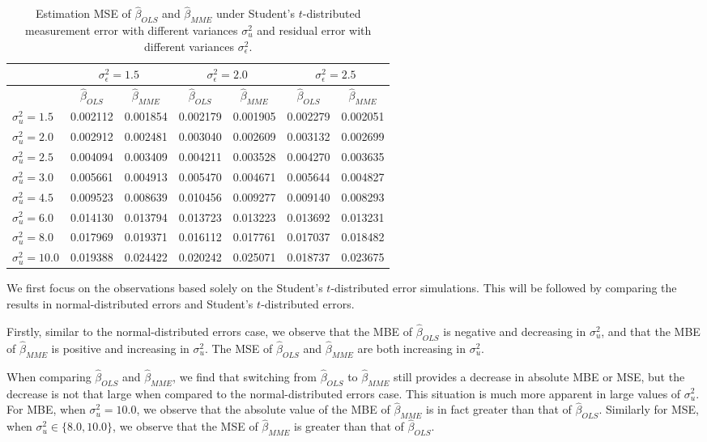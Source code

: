 \documentclass{article}
\begin{document}
\begin{table}[ht]
    \centering
    \caption{Estimation MSE of $\hat{\beta}_{OLS}$ and $\hat{\beta}_{MME}$ under Student's $t$-distributed measurement error with different variances $\sigma^2_u$ and residual error with different variances $\sigma^2_\epsilon$.}
    \label{Tab:MSE_t}
    \begin{tabular}[t]{lcccccc}
        \hline
        &\multicolumn{2}{c}{$\sigma^2_\epsilon=1.5$}&\multicolumn{2}{c}{$\sigma^2_\epsilon=2.0$}&\multicolumn{2}{c}{$\sigma^2_\epsilon=2.5$}\\
        \hline
        &$\hat{\beta}_{OLS}$&$\hat{\beta}_{MME}$&$\hat{\beta}_{OLS}$&$\hat{\beta}_{MME}$&$\hat{\beta}_{OLS}$&$\hat{\beta}_{MME}$\\
        \hline
        $\sigma^2_u = 1.5$&0.002112&0.001854&0.002179&0.001905&0.002279&0.002051\\
        $\sigma^2_u = 2.0$&0.002912&0.002481&0.003040&0.002609&0.003132&0.002699\\
        $\sigma^2_u = 2.5$&0.004094&0.003409&0.004211&0.003528&0.004270&0.003635\\
        $\sigma^2_u = 3.0$&0.005661&0.004913&0.005470&0.004671&0.005644&0.004827\\
        $\sigma^2_u = 4.5$&0.009523&0.008639&0.010456&0.009277&0.009140&0.008293\\
        $\sigma^2_u = 6.0$&0.014130&0.013794&0.013723&0.013223&0.013692&0.013231\\
        $\sigma^2_u = 8.0$&0.017969&0.019371&0.016112&0.017761&0.017037&0.018482\\
        $\sigma^2_u = 10.0$&0.019388&0.024422&0.020242&0.025071&0.018737&0.023675\\
        \hline
    \end{tabular}
\end{table}

We first focus on the observations based solely on the Student's $t$-distributed error simulations. This will be followed by comparing the results in normal-distributed errors and Student's $t$-distributed errors. 

Firstly, similar to the normal-distributed errors case, we observe that the MBE of $\hat{\beta}_{OLS}$ is negative and decreasing in $\sigma^2_u$,
and that the MBE of $\hat{\beta}_{MME}$ is positive and increasing in $\sigma^2_u$.
The MSE of $\hat{\beta}_{OLS}$ and $\hat{\beta}_{MME}$ are both increasing in $\sigma^2_u$.

When comparing $\hat{\beta}_{OLS}$ and $\hat{\beta}_{MME}$,
we find that switching from $\hat{\beta}_{OLS}$ to $\hat{\beta}_{MME}$ still provides a decrease in absolute MBE or MSE,
but the decrease is not that large when compared to the normal-distributed errors case.
This situation is much more apparent in large values of $\sigma^2_u$.
For MBE, when $\sigma^2_u = 10.0$, we observe that the absolute value of the MBE of $\hat{\beta}_{MME}$ is in fact greater than that of $\hat{\beta}_{OLS}$.
Similarly for MSE, when $\sigma^2_u \in \{8.0, 10.0\}$, we observe that the MSE of $\hat{\beta}_{MME}$ is greater than that of $\hat{\beta}_{OLS}$.
\end{document}
